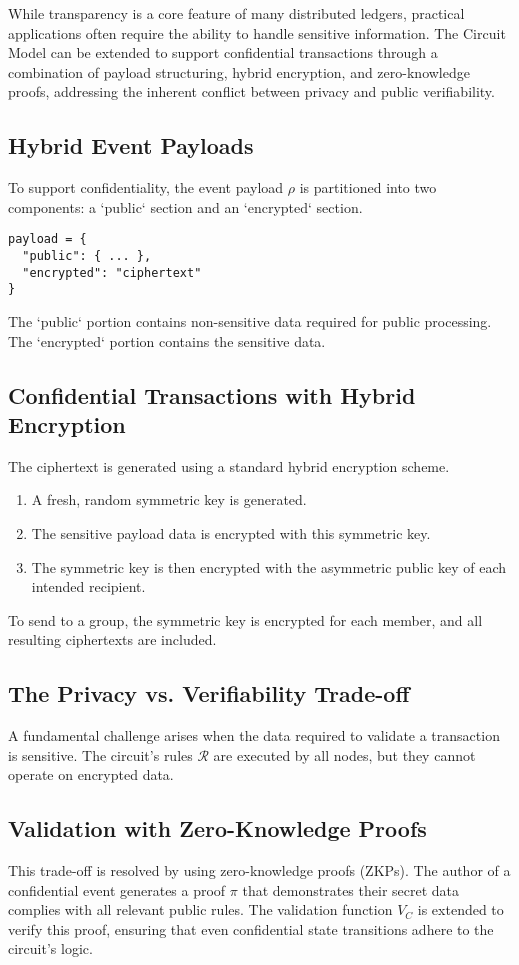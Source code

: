 \documentclass{article}
\begin{document}
While transparency is a core feature of many distributed ledgers, practical applications often require the ability to handle sensitive information. The Circuit Model can be extended to support confidential transactions through a combination of payload structuring, hybrid encryption, and zero-knowledge proofs, addressing the inherent conflict between privacy and public verifiability.

\subsection{Hybrid Event Payloads}
To support confidentiality, the event payload $\rho$ is partitioned into two components: a `public` section and an `encrypted` section.
\begin{verbatim}
payload = {
  "public": { ... },
  "encrypted": "ciphertext"
}
\end{verbatim}
The `public` portion contains non-sensitive data required for public processing. The `encrypted` portion contains the sensitive data.

\subsection{Confidential Transactions with Hybrid Encryption}
The ciphertext is generated using a standard hybrid encryption scheme.
\begin{enumerate}
    \item A fresh, random symmetric key is generated.
    \item The sensitive payload data is encrypted with this symmetric key.
    \item The symmetric key is then encrypted with the asymmetric public key of each intended recipient.
\end{enumerate}
To send to a group, the symmetric key is encrypted for each member, and all resulting ciphertexts are included.

\subsection{The Privacy vs. Verifiability Trade-off}
A fundamental challenge arises when the data required to validate a transaction is sensitive. The circuit's rules $\mathcal{R}$ are executed by all nodes, but they cannot operate on encrypted data. 

\subsection{Validation with Zero-Knowledge Proofs}
This trade-off is resolved by using zero-knowledge proofs (ZKPs). The author of a confidential event generates a proof $\pi$ that demonstrates their secret data complies with all relevant public rules. The validation function $V_C$ is extended to verify this proof, ensuring that even confidential state transitions adhere to the circuit's logic.
\end{document}
